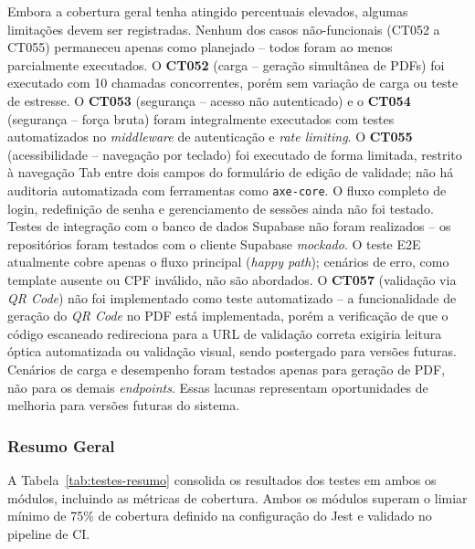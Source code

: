Embora a cobertura geral tenha atingido percentuais elevados, algumas limitações devem ser registradas. Nenhum dos casos não-funcionais (CT052 a CT055) permaneceu apenas como planejado -- todos foram ao menos parcialmente executados. O \textbf{CT052} (carga -- geração simultânea de PDFs) foi executado com 10 chamadas concorrentes, porém sem variação de carga ou teste de estresse. O \textbf{CT053} (segurança -- acesso não autenticado) e o \textbf{CT054} (segurança -- força bruta) foram integralmente executados com testes automatizados no \textit{middleware} de autenticação e \textit{rate limiting}. O \textbf{CT055} (acessibilidade -- navegação por teclado) foi executado de forma limitada, restrito à navegação Tab entre dois campos do formulário de edição de validade; não há auditoria automatizada com ferramentas como \texttt{axe-core}. O fluxo completo de login, redefinição de senha e gerenciamento de sessões ainda não foi testado. Testes de integração com o banco de dados Supabase não foram realizados -- os repositórios foram testados com o cliente Supabase \textit{mockado}. O teste E2E atualmente cobre apenas o fluxo principal (\textit{happy path}); cenários de erro, como template ausente ou CPF inválido, não são abordados. O \textbf{CT057} (validação via \textit{QR Code}) não foi implementado como teste automatizado -- a funcionalidade de geração do \textit{QR Code} no PDF está implementada, porém a verificação de que o código escaneado redireciona para a URL de validação correta exigiria leitura óptica automatizada ou validação visual, sendo postergado para versões futuras. Cenários de carga e desempenho foram testados apenas para geração de PDF, não para os demais \textit{endpoints}. Essas lacunas representam oportunidades de melhoria para versões futuras do sistema.

\subsubsection{Resumo Geral}

A Tabela~\ref{tab:testes-resumo} consolida os resultados dos testes em ambos os módulos, incluindo as métricas de cobertura. Ambos os módulos superam o limiar mínimo de 75\% de cobertura definido na configuração do Jest e validado no pipeline de CI.


